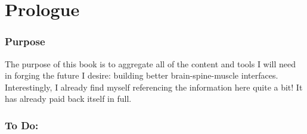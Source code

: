 \pagebreak




 



\chapter{Prologue}

\subsection{Purpose}
The purpose of this book is to aggregate all of the content and tools I will need in forging the future I desire: building better brain-spine-muscle interfaces. Interestingly, I already find myself referencing the information here quite a bit! It has already paid back itself in full.



\subsection{To Do:}

